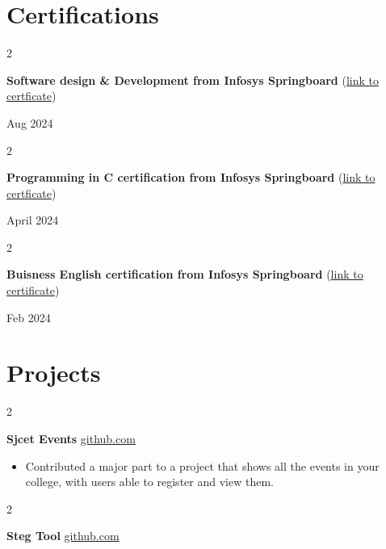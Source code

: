 \documentclass[10pt, letterpaper]{article}
\newenvironment{highlights}{
    \begin{itemize}[
        topsep=0.10 cm,
        parsep=0.10 cm,
        partopsep=0pt,
        itemsep=0pt,
        leftmargin=0 cm + 10pt
    ]
}{
    \end{itemize}
} %
\newenvironment{twocolentry}[2][]{
    \onecolentry
    \def\secondColumn{#2}
    \setcolumnwidth{\fill, 4.5 cm}
    \begin{paracol}{2}
}{
    \switchcolumn \raggedleft \secondColumn
    \end{paracol}
    \endonecolentry
} %
\begin{document}
        
    \section{Certifications}

        
        \begin{samepage}
            \begin{twocolentry}{
                Aug 2024
            }
                \textbf{Software design \& Development from Infosys Springboard}
                (\href{https://example.com}{link to certficate})
                \end{twocolentry}
            \begin{twocolentry}{
                April 2024
            }
                \textbf{Programming in C certification from Infosys Springboard} (\href{https://example.com}{link to certficate})
                \end{twocolentry}
                
            \begin{twocolentry}{
                Feb 2024
            }
                \textbf{Buisness English certification from Infosys Springboard} (\href{https://example.com}{link to certificate})
                \end{twocolentry}
        \end{samepage}


    
    \section{Projects}

            \begin{twocolentry}{
            \href{https://github.com/TimsTittus/Sjcet-Events}{github.com}
        }
            \textbf{Sjcet Events}\end{twocolentry}

        \vspace{0.10 cm}
        
            \begin{highlights}
                \item Contributed a major part to a project that shows all the events in your college, with users able to register and view them.
            \end{highlights}

        \vspace{0.10 cm}

        
            \begin{twocolentry}{
            \href{https://github.com/TimsTittus/Steg_Tool}{github.com}
        }
            \textbf{Steg Tool}\end{twocolentry}
\end{document}
